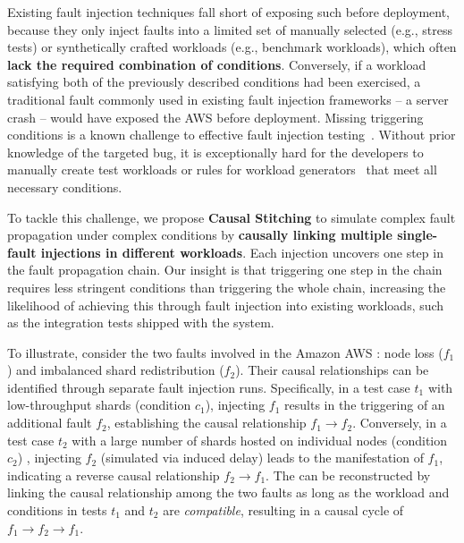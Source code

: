 Existing fault injection techniques 
\cite{wu2024efficient,li2018pcatch,crashfuzz, joshi2011prefail,natella2016assessing,
marinescu2009lfi,
alquraan2018analysis,
alvaro2015lineage,
chen2020cofi,
gunawi2011fate,
ju2013fault,
lu2019crashtuner,
mohan2018finding,
li2019efficient,
sun2022automatic,
meiklejohn2021service,
zhang20213milebeach,
chen2023push,
jepsenio} 
fall short of 
exposing such \vcs before deployment, 
because they 
only inject faults into 
a limited set of manually selected (e.g., stress tests) 
or synthetically crafted workloads (e.g., benchmark workloads), 
which often \textbf{lack the required combination of conditions}. 
Conversely, 
if a workload satisfying both of the previously described conditions 
had been exercised, 
a traditional fault commonly used in existing fault injection frameworks 
-- a server crash -- 
would have exposed the AWS \vc before deployment. 
Missing triggering conditions is a known challenge to effective fault injection testing~\cite{li2021challenges, chen2023push}. 
Without prior knowledge of the targeted bug, it is exceptionally hard for the developers to manually create test workloads or rules for workload generators~\cite{kiskis1996synthetic, han1995doctor, marinescu2009lfi, joshi2011prefail} that meet all necessary conditions. 


To tackle 
this challenge, 
we propose \textbf{Causal Stitching} to simulate complex fault propagation under complex conditions by \textbf{causally linking multiple single-fault injections in different workloads}. 
Each injection uncovers one step in the fault propagation chain. 
Our insight is that
triggering one step in the chain requires less stringent conditions than triggering the whole chain, increasing the likelihood of achieving this through fault injection into existing workloads, such as the integration tests shipped with the system. 



To illustrate, consider the two faults involved in the Amazon AWS \vc: 
node loss ($f_1$) and imbalanced shard redistribution ($f_2$). 
Their causal relationships can be identified through separate fault injection runs. 
Specifically, in a test case $t_1$ with low-throughput shards (condition $c_1$), 
injecting $f_1$ results in the triggering of an additional fault $f_2$, establishing the causal relationship $f_1 \rightarrow f_2$. 
Conversely, in a test case $t_2$ with a large number of shards hosted on individual nodes (condition $c_2$) , 
injecting $f_2$ (simulated via induced delay) 
leads to the manifestation of $f_1$, 
indicating a reverse causal relationship  $f_2 \rightarrow f_1$. 
The \vc can be reconstructed by linking the causal relationship among the two faults 
as long as the workload and conditions in tests $t_1$ and $t_2$ are \textit{compatible}, resulting in a causal cycle of $f_1 \rightarrow f_2 \rightarrow f_1$. 


